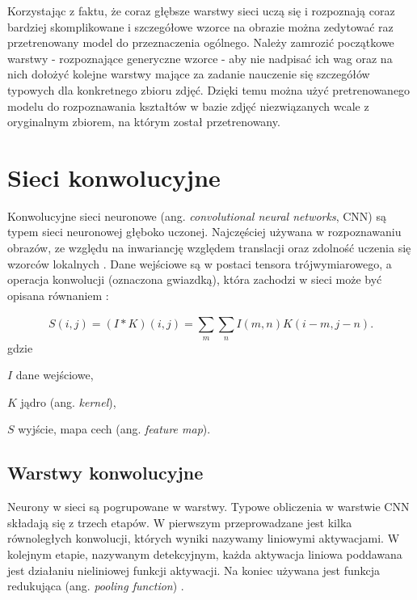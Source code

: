 Korzystając z faktu, że coraz głębsze warstwy sieci uczą się i rozpoznają coraz bardziej skomplikowane i szczegółowe wzorce na obrazie można zedytować raz przetrenowany model do przeznaczenia ogólnego. Należy zamrozić początkowe warstwy - rozpoznające generyczne wzorce - aby nie nadpisać ich wag oraz na nich dołożyć kolejne warstwy mające za zadanie nauczenie się szczegółów typowych dla konkretnego zbioru zdjęć. Dzięki temu można użyć pretrenowanego modelu do rozpoznawania kształtów w bazie zdjęć niezwiązanych wcale z oryginalnym zbiorem, na którym został przetrenowany. 


\section{Sieci konwolucyjne} \label{cnn}
Konwolucyjne sieci neuronowe (ang. \textit{convolutional neural networks}, CNN) są typem sieci neuronowej głęboko uczonej. Najczęściej używana w rozpoznawaniu obrazów, ze względu na inwariancję względem translacji oraz zdolność uczenia się wzorców lokalnych \cite{Chollet2017DeepLW}. Dane wejściowe są w postaci tensora trójwymiarowego, a operacja konwolucji (oznaczona gwiazdką), która zachodzi w sieci może być opisana równaniem \cite{deep_learning}:

\begin{equation}
S(i,j) = (I * K)(i,j) = \sum_{m}^{}\sum_{n}^{} I(m,n)K(i-m,j-n).
\end{equation}
gdzie
\begin{eqwhere}[2cm]
	\item[$I$] dane wejściowe,
	\item[$K$] jądro (ang. \textit{kernel}),
	\item[$S$] wyjście, mapa cech (ang. \textit{feature map}).
\end{eqwhere}

\subsection{Warstwy konwolucyjne}
Neurony w sieci są pogrupowane w warstwy. Typowe obliczenia w warstwie CNN składają się z trzech etapów. W pierwszym przeprowadzane jest kilka równoległych konwolucji, których wyniki nazywamy liniowymi aktywacjami. W kolejnym etapie, nazywanym detekcyjnym, każda aktywacja liniowa poddawana jest działaniu nieliniowej funkcji aktywacji. Na koniec używana jest funkcja redukująca (ang. \textit{pooling function}) \cite{deep_learning}.

